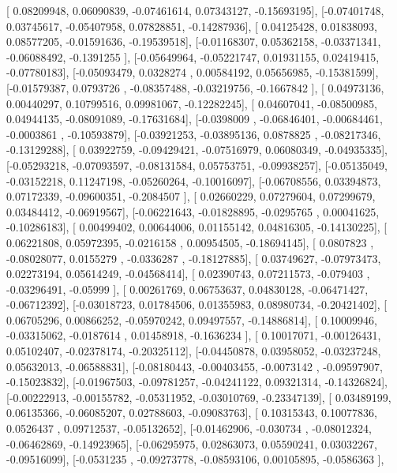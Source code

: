 \documentclass{article}
\begin{document}
       [ 0.08209948,  0.06090839, -0.07461614,  0.07343127, -0.15693195],
       [-0.07401748,  0.03745617, -0.05407958,  0.07828851, -0.14287936],
       [ 0.04125428,  0.01838093,  0.08577205, -0.01591636, -0.19539518],
       [-0.01168307,  0.05362158, -0.03371341, -0.06088492, -0.1391255 ],
       [-0.05649964, -0.05221747,  0.01931155,  0.02419415, -0.07780183],
       [-0.05093479,  0.0328274 ,  0.00584192,  0.05656985, -0.15381599],
       [-0.01579387,  0.0793726 , -0.08357488, -0.03219756, -0.1667842 ],
       [ 0.04973136,  0.00440297,  0.10799516,  0.09981067, -0.12282245],
       [ 0.04607041, -0.08500985,  0.04944135, -0.08091089, -0.17631684],
       [-0.0398009 , -0.06846401, -0.00684461, -0.0003861 , -0.10593879],
       [-0.03921253, -0.03895136,  0.0878825 , -0.08217346, -0.13129288],
       [ 0.03922759, -0.09429421, -0.07516979,  0.06080349, -0.04935335],
       [-0.05293218, -0.07093597, -0.08131584,  0.05753751, -0.09938257],
       [-0.05135049, -0.03152218,  0.11247198, -0.05260264, -0.10016097],
       [-0.06708556,  0.03394873,  0.07172339, -0.09600351, -0.2084507 ],
       [ 0.02660229,  0.07279604,  0.07299679,  0.03484412, -0.06919567],
       [-0.06221643, -0.01828895, -0.0295765 ,  0.00041625, -0.10286183],
       [ 0.00499402,  0.00644006,  0.01155142,  0.04816305, -0.14130225],
       [ 0.06221808,  0.05972395, -0.0216158 ,  0.00954505, -0.18694145],
       [ 0.0807823 , -0.08028077,  0.0155279 , -0.0336287 , -0.18127885],
       [ 0.03749627, -0.07973473,  0.02273194,  0.05614249, -0.04568414],
       [ 0.02390743,  0.07211573, -0.079403  , -0.03296491, -0.05999   ],
       [ 0.00261769,  0.06753637,  0.04830128, -0.06471427, -0.06712392],
       [-0.03018723,  0.01784506,  0.01355983,  0.08980734, -0.20421402],
       [ 0.06705296,  0.00866252, -0.05970242,  0.09497557, -0.14886814],
       [ 0.10009946, -0.03315062, -0.0187614 ,  0.01458918, -0.1636234 ],
       [ 0.10017071, -0.00126431,  0.05102407, -0.02378174, -0.20325112],
       [-0.04450878,  0.03958052, -0.03237248,  0.05632013, -0.06588831],
       [-0.08180443, -0.00403455, -0.0073142 , -0.09597907, -0.15023832],
       [-0.01967503, -0.09781257, -0.04241122,  0.09321314, -0.14326824],
       [-0.00222913, -0.00155782, -0.05311952, -0.03010769, -0.23347139],
       [ 0.03489199,  0.06135366, -0.06085207,  0.02788603, -0.09083763],
       [ 0.10315343,  0.10077836,  0.0526437 ,  0.09712537, -0.05132652],
       [-0.01462906, -0.030734  , -0.08012324, -0.06462869, -0.14923965],
       [-0.06295975,  0.02863073,  0.05590241,  0.03032267, -0.09516099],
       [-0.0531235 , -0.09273778, -0.08593106,  0.00105895, -0.0586363 ],
\end{document}
